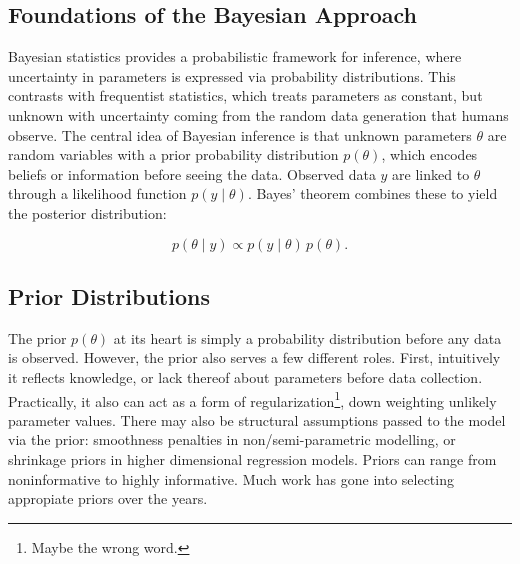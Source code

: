\subsection{Foundations of the Bayesian Approach}
Bayesian statistics provides a probabilistic framework for inference, where uncertainty in parameters is expressed via probability distributions. 
This contrasts with frequentist statistics, which treats parameters as constant, but unknown with uncertainty coming from the random data generation that humans observe.  
The central idea of Bayesian inference is that unknown parameters $\theta$ are random variables with a prior probability distribution $p(\theta)$, which encodes beliefs or information before seeing the data. Observed data $y$ are linked to $\theta$ through a likelihood function $p(y \mid \theta)$. 
Bayes' theorem combines these to yield the posterior distribution:

\[
    p(\theta \mid y) \propto p(y \mid \theta)\, p(\theta).
\]

\subsection{Prior Distributions}
The prior $p(\theta)$ at its heart is simply a probability distribution before any data is observed.  
However, the prior also serves a few different roles.  
First, intuitively it reflects knowledge, or lack thereof about parameters before data collection.  
Practically, it also can act as a form of regularization\footnote{Maybe the wrong word.}, down weighting unlikely parameter values.  
There may also be structural assumptions passed to the model via the prior: smoothness penalties in non/semi-parametric modelling, or shrinkage priors in higher dimensional regression models.  
Priors can range from noninformative to highly informative.  
Much work has gone into selecting appropiate priors over the years\cite{jaynes_prior_1968}\cite{van_erp_shrinkage_2019}\cite{kass_selection_1996}.